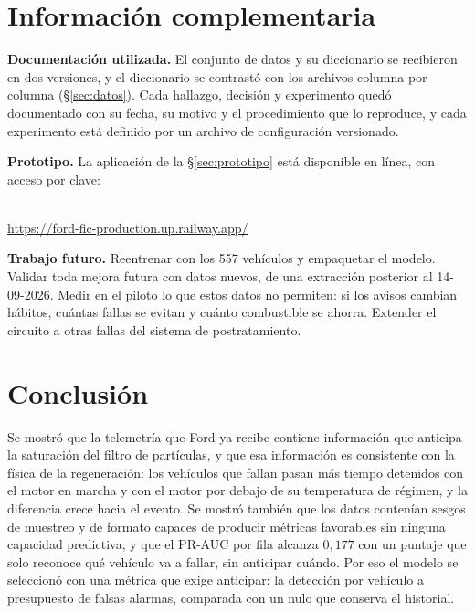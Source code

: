 \section{Información complementaria}
\label{sec:complementaria}

\textbf{Documentación utilizada.} El conjunto de datos y su diccionario se recibieron en dos versiones, y el diccionario se
contrastó con los archivos columna por columna (\S\ref{sec:datos}). Cada hallazgo, decisión y experimento quedó documentado
con su fecha, su motivo y el procedimiento que lo reproduce, y cada experimento está definido por un archivo de configuración
versionado.

\textbf{Prototipo.} La aplicación de la \S\ref{sec:prototipo} está disponible en línea, con acceso por clave:

\begin{center}
{\color{black}}\\[4pt]
\url{https://ford-fic-production.up.railway.app/}
\end{center}

\textbf{Trabajo futuro.} Reentrenar con los 557 vehículos y empaquetar el modelo. Validar toda mejora futura con datos
nuevos, de una extracción posterior al 14-09-2026. Medir en el piloto lo que estos datos no permiten: si los avisos cambian hábitos, cuántas fallas se evitan y cuánto combustible se ahorra. Extender el
circuito a otras fallas del sistema de postratamiento.

\section{Conclusión}
\label{sec:conclusion}

Se mostró que la telemetría que Ford ya recibe contiene información que anticipa la saturación del filtro de partículas, y
que esa información es consistente con la física de la regeneración: los vehículos que fallan pasan más tiempo detenidos con
el motor en marcha y con el motor por debajo de su temperatura de régimen, y la diferencia crece hacia el evento. Se mostró
también que los datos contenían sesgos de muestreo y de formato capaces de producir métricas favorables sin ninguna
capacidad predictiva, y que el PR-AUC por fila alcanza $0{,}177$ con un puntaje que solo reconoce qué vehículo va a fallar,
sin anticipar cuándo. Por eso el modelo se seleccionó con una métrica que exige anticipar: la detección por vehículo a
presupuesto de falsas alarmas, comparada con un nulo que conserva el historial.

